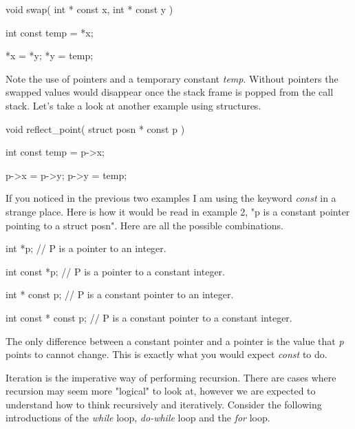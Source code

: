 \begin{code}[c]
void swap( int * const x, int * const y ) {
	int const temp = *x;
	
	*x = *y;
	*y = temp;
}
\end{code}

Note the use of pointers and a temporary constant \emph{temp}. Without pointers the swapped values would disappear once the stack frame is popped from the call stack. Let's take a look at another example using structures.\\


\begin{code}[c]
void reflect_point( struct posn * const p ) {
	int const temp = p->x;
	
	p->x = p->y;
	p->y = temp;
}
\end{code}

If you noticed in the previous two examples I am using the keyword \emph{const} in a strange place. Here is how it would be read in example 2, "p is a constant pointer pointing to a struct posn". Here are all the possible combinations.\\

\begin{code}[c]
int *p; // P is a pointer to an integer.

int const *p; // P is a pointer to a constant integer.

int * const p; // P is a constant pointer to an integer.

int const * const p; // P is a constant pointer to a constant integer.
\end{code}

The only difference between a constant pointer and a pointer is the value that \emph{p} points to cannot change. This is exactly what you would expect \emph{const} to do.\\



Iteration is the imperative way of performing recursion. There are cases where recursion may seem more "logical" to look at, however we are expected to understand how to think recursively and iteratively. Consider the following introductions of the \emph{while} loop, \emph{do-while} loop and the \emph{for} loop.\\

